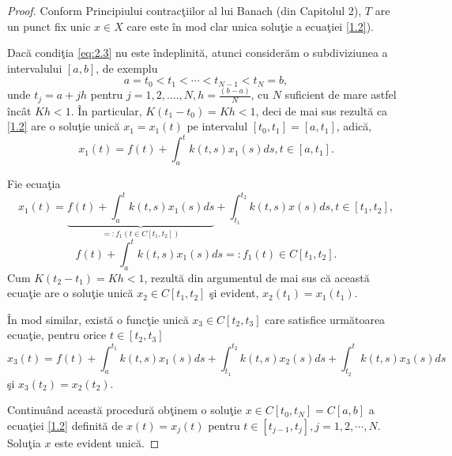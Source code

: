 \documentclass[a4paper,12pt,oneside]{report}
\begin{document}
\begin{proof}
Conform Principiului contrac\c{t}iilor al lui Banach (din Capitolul 2), \(T\) are un punct fix unic \(x \in  X\) care este \^{i}n mod clar unica solu\c{t}ie a ecua\c{t}iei  \ref{1.2}).

\noindent Dac\u{a} condi\c{t}ia \ref{eq:2.3} nu este \^{i}ndeplinit\u{a}, atunci consider\u{a}m o subdiviziunea a intervalului \(\left [ a,b \right ]\), de exemplu
\begin{displaymath}
  a = t_{0}< t_{1}< \cdots < t_{N-1}< t_{N} = b,
\end{displaymath}
unde \(t_{j} = a + jh\) pentru \(j = 1,2,….,N, h = \frac{\left ( b-a \right )}{N}\), cu \(N\) suficient de mare astfel \^{i}nc\^{a}t \(Kh < 1\). \^{I}n particular, \(K\left ( t_{1}  - t_{0}\right ) = Kh< 1\), deci de mai sus rezult\u{a} ca \ref{1.2} are o solu\c{t}ie unic\u{a} \(x_{1} = x_{1}\left ( t \right )\) pe intervalul \(\left [ t_{0} , t_{1} \right ] = \left [ a, t_{1} \right ]\), adic\u{a},
\begin{displaymath}
x_{1}\left ( t \right ) = f\left ( t \right ) + \int_{a}^{t}k\left ( t,s \right )x_{1}\left ( s \right )ds, t \in \left [ a, t_{1} \right ].
\end{displaymath}

\noindent Fie ecua\c{t}ia
\begin{displaymath}
x_{1}\left ( t \right ) =\underbrace {f\left ( t \right ) + \int_{a}^{t}k\left ( t,s \right )x_{1}\left ( s \right )ds}_{=:f_{1}\left ( t \in C\left [ t_{1}, t_{2} \right ] \right )} + \int_{t_{1}}^{t_{2}}k\left ( t,s \right )x\left ( s \right )ds,  t\in \left [ t_{1}, t_{2} \right ],
\end{displaymath}
\begin{displaymath}
f\left ( t \right ) + \int_{a}^{t}k\left ( t,s \right )x_{1}\left ( s \right )ds =:f_{1}\left ( t \right ) \in C \left [ t_{1} , t_{2} \right ].
\end{displaymath}
Cum \(K\left ( t_{2} - t_{1} \right ) = Kh < 1\), rezult\u{a} din argumentul de mai sus c\u{a} aceast\u{a} ecua\c{t}ie are o solu\c{t}ie unic\u{a} \(x_{2} \in C\left [ t_{1}, t_{2} \right ]\)  \c{s}i evident, \(x_{2} \left ( t_{1} \right ) = x_{1} \left ( t_{1} \right )\).

\^{I}n mod similar, exist\u{a} o func\c{t}ie unic\u{a} \(x_{3} \in C\left [ t_{2}, t_{3} \right ]\) care satisfice urm\u{a}toarea ecua\c{t}ie, pentru orice \(t\in \left [ t_{2} , t_{3} \right ]\)
\begin{displaymath}
x_{3}\left ( t \right ) = f\left ( t \right ) + \int_{a}^{t_{1}}k\left ( t,s \right )x_{1}\left ( s \right )ds + \int_{t_{1}}^{t_{2}}k\left ( t,s \right )x_{2}\left ( s \right )ds + \int_{t_{2}}^{t}k\left ( t,s \right )x_{3}\left ( s \right )ds
\end{displaymath}
\c{s}i \(x_{3}\left ( t_{2} \right ) = x_{2}\left ( t_{2} \right )\).

Continu\^{a}nd aceast\u{a} procedur\u{a} ob\c{t}inem o solu\c{t}ie \(x\in C\left [ t_{0}, t_{N} \right ] = C\left [ a,b \right ]\) a ecua\c{t}iei \ref{1.2} definit\u{a} de \(x\left ( t \right ) = x_{j}\left ( t \right )\) pentru \(t\in \left [ t_{j-1}, t_{j} \right ], j = 1,2,\cdots,N\). Solu\c{t}ia \(x\) este evident unic\u{a}.
\end{proof}
\end{document}

